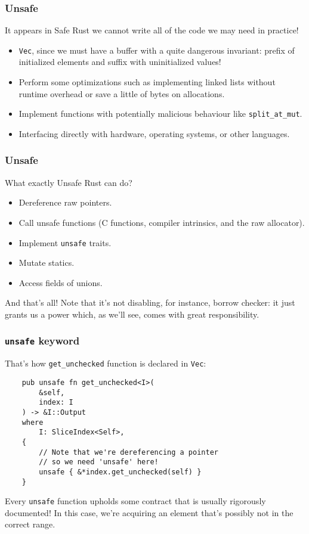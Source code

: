 \documentclass[aspectratio=1610,t]{beamer}
\begin{document}
\begin{frame}[fragile]
\frametitle{Unsafe}
It appears in Safe Rust we cannot write all of the code we may need in practice!

\begin{itemize}
    \item<2-> \texttt{Vec}, since we must have a buffer with a quite dangerous invariant: prefix of initialized elements and suffix with uninitialized values!
    \item<3-> Perform some optimizations such as implementing linked lists without runtime overhead or save a little of bytes on allocations.
    \item<4-> Implement functions with potentially malicious behaviour like \texttt{split\_at\_mut}.
    \item<5-> Interfacing directly with hardware, operating systems, or other languages.
\end{itemize}
\end{frame}


\begin{frame}[fragile]
\frametitle{Unsafe}
What exactly Unsafe Rust can do?

\begin{itemize}
    \item Dereference raw pointers.
    \item Call unsafe functions (C functions, compiler intrinsics, and the raw allocator).
    \item Implement \texttt{unsafe} traits.
    \item Mutate statics.
    \item Access fields of unions.
\end{itemize}

And that's all! Note that it's not disabling, for instance, borrow checker: it just grants us a power which, as we'll see, comes with great responsibility.
\end{frame}


\begin{frame}[fragile]
\frametitle{\texttt{unsafe} keyword}
That's how \texttt{get\_unchecked} function is declared in \texttt{Vec}:

\begin{verbatim}
    pub unsafe fn get_unchecked<I>(
        &self,
        index: I
    ) -> &I::Output
    where
        I: SliceIndex<Self>,
    {
        // Note that we're dereferencing a pointer
        // so we need 'unsafe' here!
        unsafe { &*index.get_unchecked(self) }
    }
\end{verbatim}

Every \texttt{unsafe} function upholds some contract that is usually rigorously documented! In this case, we're acquiring an element that's possibly not in the correct range.
\end{frame}
\end{document}
